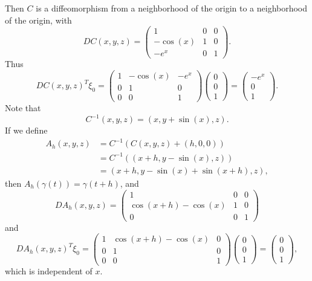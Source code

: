 \documentclass[dvipsnames,letterpaper,12pt]{article}
\begin{document}
Then $C$ is a diffeomorphism from a neighborhood of the origin to a neighborhood of the origin, with
%
\[ DC(x,y,z) = \begin{pmatrix} 1 & 0 & 0 \\ - \cos(x) & 1 & 0 \\ - e^x & 0 & 1 \end{pmatrix}. \]
%
Thus
%
\[ DC(x,y,z)^T \xi_0 = \begin{pmatrix} 1 & -\cos(x) & - e^x \\ 0 & 1 & 0 \\ 0 & 0 & 1 \end{pmatrix} \begin{pmatrix} 0 \\ 0 \\ 1 \end{pmatrix} = \begin{pmatrix} - e^x \\ 0 \\ 1 \end{pmatrix}. \]
%
Note that
%
\[ C^{-1}(x,y,z) = (x, y + \sin(x), z). \]
%
If we define
%
\begin{align*}
    A_h(x,y,z) &= C^{-1} \left( C(x,y,z) + (h,0,0) \right)\\
    &= C^{-1} \left( (x + h, y - \sin(x), z) \right)\\
    &= (x + h, y - \sin(x) + \sin(x + h), z ),
\end{align*}
%
then $A_h(\gamma(t)) = \gamma(t + h)$, and 
%
\[ DA_h(x,y,z) = \begin{pmatrix} 1 & 0 & 0 \\ \cos(x + h) - \cos(x) & 1 & 0 \\ 0 & 0 & 1 \end{pmatrix} \]
%
and
%
\[ DA_h(x,y,z)^T \xi_0 = \begin{pmatrix} 1 & \cos(x + h) - \cos(x) & 0 \\ 0 & 1 & 0 \\ 0 & 0 & 1 \end{pmatrix} \begin{pmatrix} 0 \\ 0 \\ 1 \end{pmatrix} = \begin{pmatrix} 0 \\ 0 \\ 1 \end{pmatrix}, \]
%
which is independent of $x$.
\end{document}
